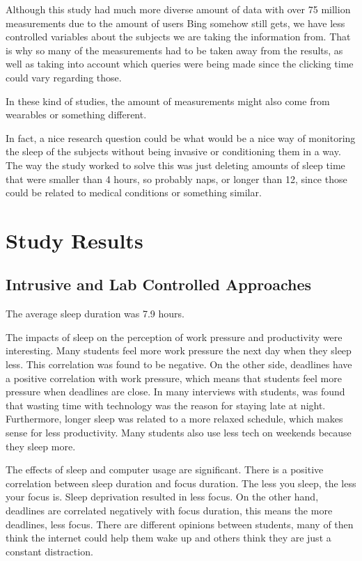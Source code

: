 \documentclass[]{IEEEtran}
\begin{document}
Although this study had much more diverse amount of data with over 75 million measurements due to the amount of users Bing somehow still gets, we have less controlled variables about the subjects we are taking the information from. That is why so many of the measurements had to be taken away from the results, as well as taking into account which queries were being made since the clicking time could vary regarding those. \par 

In these kind of studies, the amount of measurements might also come from wearables or something different. \par 

In fact, a nice research question could be what would be a nice way of monitoring the sleep of the subjects without being invasive or conditioning them in a way. The way the study worked to solve this was just deleting amounts of sleep time that were smaller than 4 hours, so probably naps, or longer than 12, since those could be related to medical conditions or something similar. 

\section{Study Results}

\subsection{Intrusive and Lab Controlled Approaches}

The average sleep duration was 7.9 hours. 

The impacts of sleep on the perception of work pressure and productivity were interesting. Many students feel more work pressure the next day when they sleep less. This correlation was found to be negative. On the other side, deadlines have a positive correlation with work pressure, which means that students feel more pressure when deadlines are close. In many interviews with students, was found that wasting time with technology was the reason for staying late at night. Furthermore, longer sleep was related to a more relaxed schedule, which makes sense for less productivity. Many students also use less tech on weekends because they sleep more.

The effects of sleep and computer usage are significant. There is a positive correlation between sleep duration and focus duration. The less you sleep, the less your focus is. Sleep deprivation resulted in less focus. On the other hand, deadlines are correlated negatively with focus duration, this means the more deadlines, less focus. There are different opinions between students, many of then think the internet could help them wake up and others think they are just a constant distraction.
\end{document}
